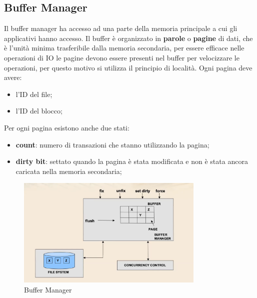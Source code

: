 \documentclass[12pt]{article}
\begin{document}
\subsection{Buffer Manager}
Il buffer manager ha accesso ad una parte della memoria principale a cui gli applicativi hanno accesso. Il buffer \`e organizzato in \textbf{parole} o \textbf{pagine} di dati, che \`e l'unit\`a minima trasferibile dalla memoria secondaria, per essere efficace nelle operazioni di IO le pagine devono essere presenti nel buffer per velocizzare le operazioni, per questo motivo si utilizza il principio di localit\`a. Ogni pagina deve avere:
\begin{itemize}
    \item l'ID del file;
    \item l'ID del blocco;
\end{itemize}
Per ogni pagina esistono anche due stati:
\begin{itemize}
    \item \textbf{count}: numero di transazioni che stanno utilizzando la pagina;
    \item \textbf{dirty bit}: settato quando la pagina \`e stata modificata e non \`e stata ancora caricata nella memoria secondaria;
\end{itemize}
\begin{figure}[H]
    \centering
    \includegraphics[width=0.8\textwidth]{buffer-manager.png}
    \caption{Buffer Manager}
    \label{fig:buffer-manager}
\end{figure}
\end{document}
